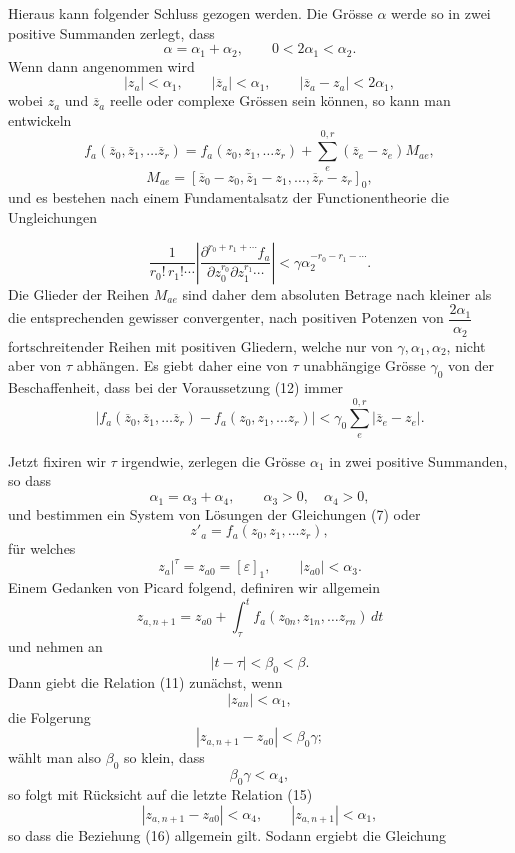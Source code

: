 \documentclass[11pt,a4paper,leqno]{article}
\begin{document}
Hieraus kann folgender Schluss gezogen werden. Die Grösse $\alpha$ werde
so in zwei positive Summanden zerlegt, dass
\[
\alpha=\alpha_1+\alpha_2,\qquad 0<2\alpha_1<\alpha_2.
\]
Wenn dann angenommen wird
\begin{equation}\tag{12}
|z_a|<\alpha_1,\qquad |\overline z_a|<\alpha_1,\qquad
|\overline z_a-z_a|<2\alpha_1,
\end{equation}
wobei $z_a$ und $\overline z_a$ reelle oder complexe Grössen sein können,
so kann man entwickeln
\[
f_a(\overline z_0,\overline z_1,\ldots\overline z_r)
=f_a(z_0,z_1,\ldots z_r)
+\sum_e^{0,r}(\overline z_e-z_e)M_{ae},
\]
\[
M_{ae}=[\overline z_0-z_0,\overline z_1-z_1,\ldots,
\overline z_r-z_r]_0,
\]
und es bestehen nach einem Fundamentalsatz der Functionentheorie die
Ungleichungen

\[
\frac{1}{r_0!\,r_1!\cdots}
\left|\frac{\partial^{r_0+r_1+\cdots}f_a}
{\partial z_0^{r_0}\partial z_1^{r_1}\cdots}\right|
<\gamma\alpha_2^{-r_0-r_1-\cdots}.
\]
Die Glieder der Reihen $M_{ae}$ sind daher dem absoluten Betrage nach
kleiner als die entsprechenden gewisser convergenter, nach positiven
Potenzen von $\dfrac{2\alpha_1}{\alpha_2}$ fortschreitender Reihen mit
positiven Gliedern, welche nur von $\gamma,\alpha_1,\alpha_2$, nicht aber
von $\tau$ abhängen. Es giebt daher eine von $\tau$ unabhängige Grösse
$\gamma_0$ von der Beschaffenheit, dass bei der Voraussetzung (12) immer
\begin{equation}\tag{13}
|f_a(\overline z_0,\overline z_1,\ldots\overline z_r)
-f_a(z_0,z_1,\ldots z_r)|
<\gamma_0\sum_e^{0,r}|\overline z_e-z_e|.
\end{equation}

Jetzt fixiren wir $\tau$ irgendwie, zerlegen die Grösse $\alpha_1$ in
zwei positive Summanden, so dass
\[
\alpha_1=\alpha_3+\alpha_4,\qquad \alpha_3>0,\quad\alpha_4>0,
\]
und bestimmen ein System von Lösungen der Gleichungen (7) oder
\begin{equation}\tag{14}
z'_a=f_a(z_0,z_1,\ldots z_r),
\end{equation}
für welches
\begin{equation}\tag{15}
\left.z_a\right|^\tau=z_{a0}=[\varepsilon]_1,\qquad
|z_{a0}|<\alpha_3.
\end{equation}
Einem Gedanken von Picard folgend, definiren wir allgemein
\[
z_{a,n+1}=z_{a0}+\int_\tau^t
f_a(z_{0n},z_{1n},\ldots z_{rn})\,dt
\]
und nehmen an
\[
|t-\tau|<\beta_0<\beta.
\]
Dann giebt die Relation (11) zunächst, wenn
\begin{equation}\tag{16}
|z_{an}|<\alpha_1,
\end{equation}
die Folgerung
\[
|z_{a,n+1}-z_{a0}|<\beta_0\gamma;
\]
wählt man also $\beta_0$ so klein, dass
\begin{equation}\tag{17}
\beta_0\gamma<\alpha_4,
\end{equation}
so folgt mit Rücksicht auf die letzte Relation (15)
\[
|z_{a,n+1}-z_{a0}|<\alpha_4,\qquad |z_{a,n+1}|<\alpha_1,
\]
so dass die Beziehung (16) allgemein gilt. Sodann ergiebt die Gleichung
\end{document}
